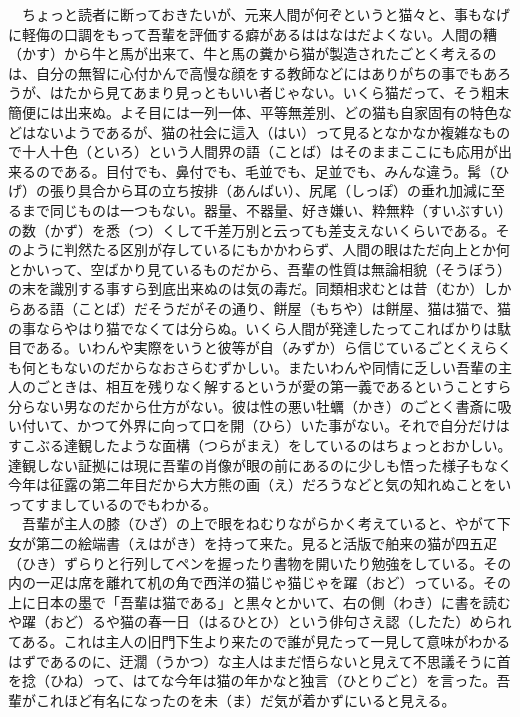 　ちょっと読者に断っておきたいが、元来人間が何ぞというと猫々と、事もなげに軽侮の口調をもって吾輩を評価する癖があるははなはだよくない。人間の糟（かす）から牛と馬が出来て、牛と馬の糞から猫が製造されたごとく考えるのは、自分の無智に心付かんで高慢な顔をする教師などにはありがちの事でもあろうが、はたから見てあまり見っともいい者じゃない。いくら猫だって、そう粗末簡便には出来ぬ。よそ目には一列一体、平等無差別、どの猫も自家固有の特色などはないようであるが、猫の社会に這入（はい）って見るとなかなか複雑なもので十人十色（といろ）という人間界の語（ことば）はそのままここにも応用が出来るのである。目付でも、鼻付でも、毛並でも、足並でも、みんな違う。髯（ひげ）の張り具合から耳の立ち按排（あんばい）、尻尾（しっぽ）の垂れ加減に至るまで同じものは一つもない。器量、不器量、好き嫌い、粋無粋（すいぶすい）の数（かず）を悉（つ）くして千差万別と云っても差支えないくらいである。そのように判然たる区別が存しているにもかかわらず、人間の眼はただ向上とか何とかいって、空ばかり見ているものだから、吾輩の性質は無論相貌（そうぼう）の末を識別する事すら到底出来ぬのは気の毒だ。同類相求むとは昔（むか）しからある語（ことば）だそうだがその通り、餅屋（もちや）は餅屋、猫は猫で、猫の事ならやはり猫でなくては分らぬ。いくら人間が発達したってこればかりは駄目である。いわんや実際をいうと彼等が自（みずか）ら信じているごとくえらくも何ともないのだからなおさらむずかしい。またいわんや同情に乏しい吾輩の主人のごときは、相互を残りなく解するというが愛の第一義であるということすら分らない男なのだから仕方がない。彼は性の悪い牡蠣（かき）のごとく書斎に吸い付いて、かつて外界に向って口を開（ひら）いた事がない。それで自分だけはすこぶる達観したような面構（つらがまえ）をしているのはちょっとおかしい。達観しない証拠には現に吾輩の肖像が眼の前にあるのに少しも悟った様子もなく今年は征露の第二年目だから大方熊の画（え）だろうなどと気の知れぬことをいってすましているのでもわかる。\\
　吾輩が主人の膝（ひざ）の上で眼をねむりながらかく考えていると、やがて下女が第二の絵端書（えはがき）を持って来た。見ると活版で舶来の猫が四五疋（ひき）ずらりと行列してペンを握ったり書物を開いたり勉強をしている。その内の一疋は席を離れて机の角で西洋の猫じゃ猫じゃを躍（おど）っている。その上に日本の墨で「吾輩は猫である」と黒々とかいて、右の側（わき）に書を読むや躍（おど）るや猫の春一日（はるひとひ）という俳句さえ認（したた）められてある。これは主人の旧門下生より来たので誰が見たって一見して意味がわかるはずであるのに、迂濶（うかつ）な主人はまだ悟らないと見えて不思議そうに首を捻（ひね）って、はてな今年は猫の年かなと独言（ひとりごと）を言った。吾輩がこれほど有名になったのを未（ま）だ気が着かずにいると見える。\\
